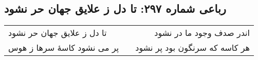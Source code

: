 \begin{center}
\section*{رباعی شماره ۲۹۷: تا دل ز علایق جهان حر نشود}
\label{sec:sh297}
\begin{longtable}{l p{0.5cm} r}
تا دل ز علایق جهان حر نشود
&&
اندر صدف وجود ما در نشود
\\
پر می نشود کاسهٔ سرها ز هوس
&&
هر کاسه که سرنگون بود پر نشود
\\
\end{longtable}
\end{center}
